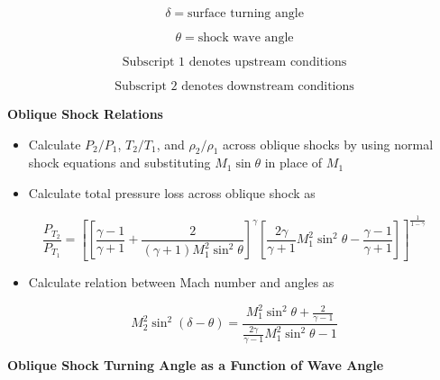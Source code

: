 \documentclass[
]{book}
\providecommand{\tightlist}{%
  \setlength{\itemsep}{0pt}\setlength{\parskip}{0pt}}
\begin{document}
\[\delta = \text{surface turning angle}\]

\[\theta = \text{shock wave angle}\]

\[\text{Subscript 1 denotes upstream conditions}\]

\[\text{Subscript 2 denotes downstream conditions}\]

\textbf{Oblique Shock Relations}

\begin{itemize}
\tightlist
\item
  Calculate \(P_2/P_1\), \(T_2/T_1\), and \(\rho_2/\rho_1\) across oblique shocks by using normal shock equations and substituting \(M_1 \sin\theta\) in place of \(M_1\)
\item
  Calculate total pressure loss across oblique shock as
\end{itemize}

\[\frac{P_{T_2}}{P_{T_1}} = \left[\left[\frac{\gamma - 1}{\gamma + 1} + \frac{2}{{\left(\gamma + 1\right)M_1^2\sin^2\theta}}\right]^{\gamma} \left[\frac{2\gamma}{\gamma+1} M_1^2\sin^2\theta - \frac{\gamma - 1}{\gamma + 1} \right]\right]^{\frac{1}{1 - \gamma}}  \]

\begin{itemize}
\tightlist
\item
  Calculate relation between Mach number and angles as
\end{itemize}

\[M_2^2\sin^2\left(\delta - \theta\right) = \frac{M_1^2 \sin^2\theta + \frac{2}{\gamma-1}}{\frac{2\gamma}{\gamma - 1} M_1^2\sin^2\theta - 1} \]

\textbf{Oblique Shock Turning Angle as a Function of Wave Angle}
\end{document}
